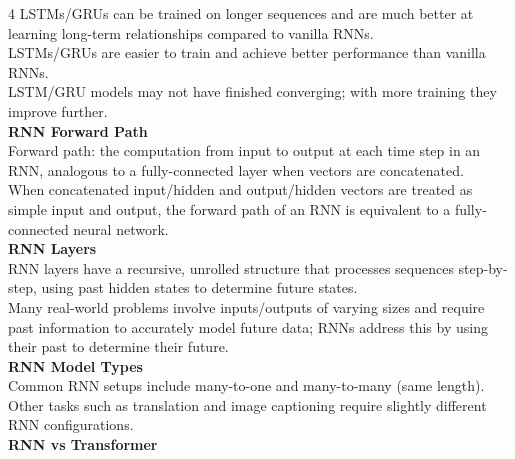 \documentclass[8pt]{extarticle}
\begin{document}
\begin{multicols}{4}
{LSTMs/GRUs can be trained on longer sequences and are much better at learning long-term relationships compared to vanilla RNNs.\\
LSTMs/GRUs are easier to train and achieve better performance than vanilla RNNs.\\
LSTM/GRU models may not have finished converging; with more training they improve further.\\
\vspace{2pt}\textbf{RNN Forward Path}\\
Forward path: the computation from input to output at each time step in an RNN, analogous to a fully-connected layer when vectors are concatenated.\\
When concatenated input/hidden and output/hidden vectors are treated as simple input and output, the forward path of an RNN is equivalent to a fully-connected neural network.\\
\vspace{2pt}\textbf{RNN Layers}\\
RNN layers have a recursive, unrolled structure that processes sequences step-by-step, using past hidden states to determine future states.\\
Many real-world problems involve inputs/outputs of varying sizes and require past information to accurately model future data; RNNs address this by using their past to determine their future.\\
\vspace{2pt}\textbf{RNN Model Types}\\
Common RNN setups include many-to-one and many-to-many (same length). Other tasks such as translation and image captioning require slightly different RNN configurations.\\
\vspace{2pt}\textbf{RNN vs Transformer}\\

}
\end{multicols}
\end{document}
